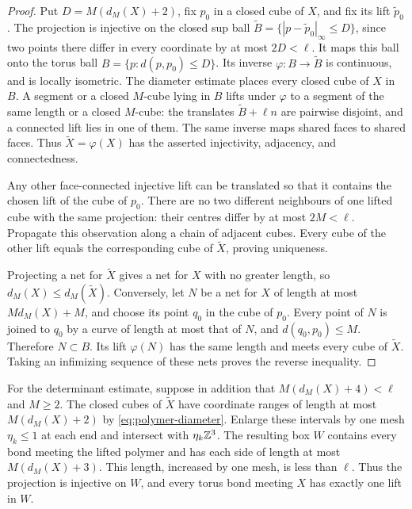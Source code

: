 \begin{proof}
Put $D=M(d_M(X)+2)$, fix $p_0$ in a closed cube of $X$, and fix its
lift $\widetilde p_0$. The projection is injective on the closed sup
ball $\widetilde B=\{|p-\widetilde p_0|_\infty\le D\}$, since two
points there differ in every coordinate by at most $2D<\ell$.
It maps this ball onto the torus ball $B=\{p:d(p,p_0)\le D\}$.
Its inverse $\varphi:B\to\widetilde B$ is continuous, and is locally
isometric. The diameter estimate places every closed cube of $X$ in
$B$. A segment or a closed $M$-cube lying in $B$ lifts under
$\varphi$ to a segment of the same length or a closed $M$-cube:
the translates $\widetilde B+\ell n$ are pairwise disjoint, and a
connected lift lies in one of them. The same inverse maps shared
faces to shared faces. Thus $\widetilde X=\varphi(X)$ has the
asserted injectivity, adjacency, and connectedness.

Any other face-connected injective lift can be translated so that it
contains the chosen lift of the cube of $p_0$. There are no two
different neighbours of one lifted cube with the same projection:
their centres differ by at most $2M<\ell$. Propagate this observation
along a chain of adjacent cubes. Every cube of the other lift equals
the corresponding cube of $\widetilde X$, proving uniqueness.

Projecting a net for $\widetilde X$ gives a net for $X$ with no greater
length, so $d_M(X)\le d_M(\widetilde X)$. Conversely, let $N$ be a
net for $X$ of length at most $Md_M(X)+M$, and choose its point $q_0$
in the cube of $p_0$. Every point of $N$ is joined to $q_0$ by a
curve of length at most that of $N$, and $d(q_0,p_0)\le M$.
Therefore $N\subset B$. Its lift $\varphi(N)$ has the same length
and meets every cube of $\widetilde X$. Taking an infimizing sequence
of these nets proves the reverse inequality.
\end{proof}

For the determinant estimate, suppose in addition that
$M(d_M(X)+4)<\ell$ and $M\ge2$. The closed cubes of $\widetilde X$
have coordinate ranges of length at most $M(d_M(X)+2)$ by
\eqref{eq:polymer-diameter}. Enlarge these intervals by one mesh
$\eta_k\le1$ at each end and intersect with $\eta_k\mathbb Z^3$. The
resulting box $W$ contains every bond meeting the lifted polymer and
has each side of length at most $M(d_M(X)+3)$. This length, increased
by one mesh, is less than $\ell$. Thus the projection is injective
on $W$, and every torus bond meeting $X$ has exactly one lift in $W$.

\printbibliography

